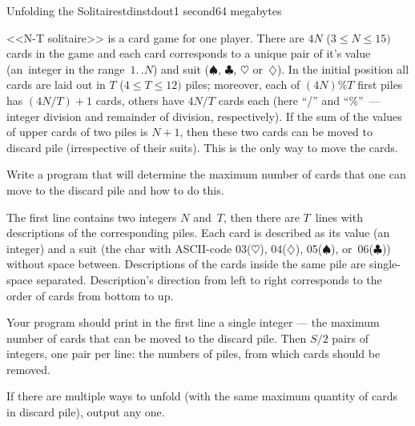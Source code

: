 \begin{problem}{Unfolding the Solitaire}{stdin}{stdout}{1 second}{64 megabytes}

<<N-T solitaire>> is a card game for one player. There are $4N$ 
($3\leq N\leq 15)$ cards in the game and each card corresponds to a unique pair of it's value (an~integer in the range~$1.\,.N$) and suit ($\spadesuit$, $\clubsuit$, $\heartsuit$ or~$\diamondsuit$). In the initial position all cards are laid out in $T$ ($4\leq T\leq 12)$ piles; moreover, each of $(4N)\%T$ first piles has $(4N/T)+1$ cards, others have $4N/T$ cards each (here ``/'' and ``\%''~--- integer division and remainder of division, respectively). If the sum of the values of upper cards of two piles is $N+1$, then these two cards can be moved to discard pile (irrespective of their suits). This is the only way to move the cards.

Write a program that will determine the maximum number of cards that one can move to the discard pile and how to do this.

\InputFile
The first line contains two integers $N$ and~$T$, then there are $T$~lines with descriptions of the corresponding piles. Each card is described as its value (an integer) and a suit (the char with ASCII-code 03($\heartsuit$), 04($\diamondsuit$), 05($\spadesuit$), or~06($\clubsuit$)) without space between. Descriptions of the cards inside the same pile are single-space separated. Description's direction from left to right corresponds to the order of cards from bottom to up.

\OutputFile
Your program should print in the first line a single integer --- the maximum number of cards that can be moved to the discard pile.
Then $S/2$ pairs of integers, one pair per line: the numbers of piles, from which cards should be removed.

\Examples

\begin{example}
%
\end{example}

\Note
If there are multiple ways to unfold (with the same maximum quantity of cards in discard pile), output any one.

\end{problem}
